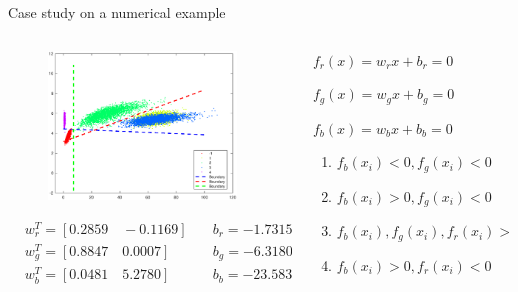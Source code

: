 \documentclass[10pt]{beamer}
\begin{document}
\begin{frame}{Case study on a numerical example}
     \begin{columns}
             \begin{column}{0.6\textwidth}
              \begin{figure}
              \centering
           \includegraphics[width=5cm]{fig/perfectR.eps}
            \end{figure}
            \begin{equation} \nonumber
            \begin{aligned}
         &w_r^T = [0.2859  \quad  -0.1169] \quad &b_r =  -1.7315 \\
         &w_g^T = [0.8847 \quad 0.0007]\quad &b_g =-6.3180  \\
         &w_b^T = [0.0481 \quad 5.2780] \quad &b_b = -23.5837  \\
           \end{aligned}
            \end{equation}
           \end{column}
        \begin{column}{0.4\textwidth}  %
         $f_r(x)=w_rx+b_r =0$ \par
         $f_g(x)=w_gx+b_g = 0$ \par
         $f_b(x) = w_bx+b_b = 0$ \par 
         \begin{enumerate}
             \item $f_b(x_i)<0,f_g(x_i)< 0$ 
             \item $f_b(x_i)>0,f_g(x_i)< 0$
             \item $f_b(x_i),f_g(x_i),f_r(x_i)>0$
             \item $f_b(x_i)>0,f_r(x_i)<0$
         \end{enumerate}
        \end{column}
    \end{columns}
\end{frame}
\end{document}
